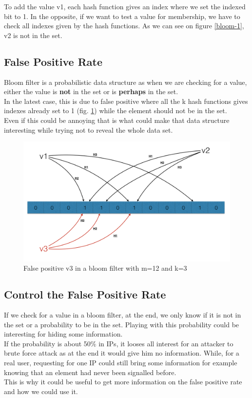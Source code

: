 \documentclass{eplmastersthesis}
\begin{document}
To add the value v1, each hash function gives an index where we set the indexed bit to 1. In the opposite, if we want to test a value for membership, we have to check all indexes given by the hash functions. As we can see on figure \ref{bloom-1}, v2 is not in the set.

\subsection{False Positive Rate}

Bloom filter is a probabilistic data structure as when we are checking for a value, either the value is \textbf{not} in the set or is \textbf{perhaps} in the set. \\
In the latest case, this is due to false positive where all the k hash functions gives indexes already set to 1 (fig. \ref{bloom-2}) while the element should not be in the set.\\
Even if this could be annoying that is what could make that data structure interesting while trying not to reveal the whole data set.
\begin{figure}[h!]
	\begin{center}
		\includegraphics[scale=0.3]{res/bloom-2}
		\caption{False positive v3 in a bloom filter with m=12 and k=3}
		\label{bloom-2}
	\end{center}
\end{figure}

\subsection{Control the False Positive Rate}
If we check for a value in a bloom filter, at the end, we only know if it is not in the set or a probability to be in the set. Playing with this probability could be interesting for hiding some information. \\
If the probability is about 50\% in IPs, it looses all interest for an attacker to brute force attack as at the end it would give him no information. While, for a real user, requesting for one IP could still bring some information for example knowing that an element had never been signalled before.\\
This is why it could be useful to get more information on the false positive rate and how we could use it.\\
\end{document}
